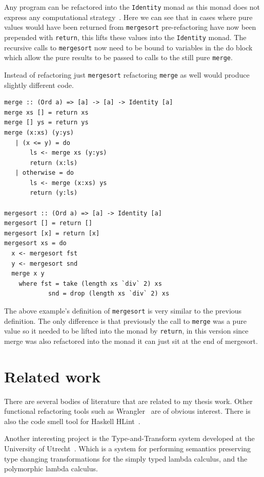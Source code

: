 Any program can be refactored into the \texttt{Identity} monad as this monad does not express any computational strategy~\citep{identityMonad}. Here we can see that in cases where pure values would have been returned from \texttt{mergesort} pre-refactoring have now been prepended with \texttt{return}, this lifts these values into the \texttt{Identity} monad. The recursive calls to \texttt{mergesort} now need to be bound to variables in the do block which allow the pure results to be passed to calls to the still pure \texttt{merge}.

Instead of refactoring just \texttt{mergesort} refactoring \texttt{merge} as well would produce slightly different code.

\begin{lstlisting}[frame = tblr]
merge :: (Ord a) => [a] -> [a] -> Identity [a]
merge xs [] = return xs
merge [] ys = return ys
merge (x:xs) (y:ys)
   | (x <= y) = do
       ls <- merge xs (y:ys)
       return (x:ls)
   | otherwise = do
       ls <- merge (x:xs) ys
       return (y:ls)

mergesort :: (Ord a) => [a] -> Identity [a]
mergesort [] = return []
mergesort [x] = return [x]
mergesort xs = do
  x <- mergesort fst
  y <- mergesort snd
  merge x y
    where fst = take (length xs `div` 2) xs
            snd = drop (length xs `div` 2) xs
\end{lstlisting}

The above example's definition of \texttt{mergesort} is very similar to the previous definition. The only difference is that previously the call to \texttt{merge} was a pure value so it needed to be lifted into the monad by \texttt{return}, in this version since merge was also refactored into the monad it can just sit at the end of mergesort.

\fi 
\chapter{Related work}

There are several bodies of literature that are related to my thesis work. Other functional refactoring tools such as Wrangler~\citep{wrangler} are of obvious interest. There is also the code smell tool for Haskell HLint~\citep{hlint}.

Another interesting project is the Type-and-Transform system developed at the University of Utrecht~\citep{typeAndTransform}. Which is a system for performing semantics preserving type changing transformations for the simply typed lambda calculus, and the polymorphic lambda calculus.

